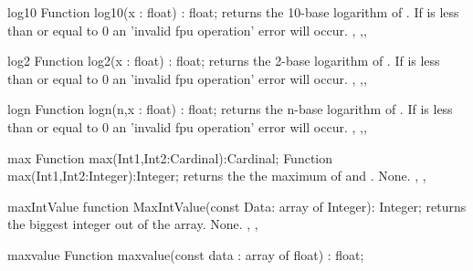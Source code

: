 
\begin{function}{log10}
\Declaration
Function log10(x : float) : float;
\Description
{} returns the 10-base logarithm of .
\Errors
If  is less than or equal to 0 an 'invalid fpu operation' error
will occur.
\SeeAlso
{}, ,,
\end{function}



\begin{function}{log2}
\Declaration
Function log2(x : float) : float;
\Description
{} returns the 2-base logarithm of .
\Errors
If  is less than or equal to 0 an 'invalid fpu operation' error
will occur.
\SeeAlso
{}, ,,
\end{function}



\begin{function}{logn}
\Declaration
Function logn(n,x : float) : float;
\Description
{} returns the n-base logarithm of .
\Errors
If  is less than or equal to 0 an 'invalid fpu operation' error
will occur.
\SeeAlso
{}, ,,
\end{function}


\begin{function}{max}
\Declaration
Function max(Int1,Int2:Cardinal):Cardinal;
Function max(Int1,Int2:Integer):Integer;
\Description
{} returns the the maximum of  and .
\Errors
None.
\SeeAlso
{}, , \seef{\maxvalue}
\end{function}


\begin{function}{maxIntValue}
\Declaration
function MaxIntValue(const Data: array of Integer): Integer;
\Description
{} returns the biggest integer out of the 
array.
\Errors
None.
\SeeAlso
{}, , 
\end{function}

\FPCexample{}


\begin{function}{maxvalue}
\Declaration
Function maxvalue(const data : array of float) : float;
\Description

\Errors
\SeeAlso
\end{function}

